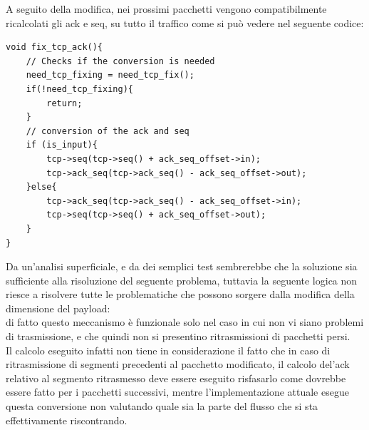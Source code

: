 A seguito della modifica, nei prossimi pacchetti vengono compatibilmente ricalcolati gli ack e seq, su tutto il traffico come si può vedere nel seguente codice:

\begin{listing}[H]
    \begin{verbatim}
void fix_tcp_ack(){
    // Checks if the conversion is needed
    need_tcp_fixing = need_tcp_fix();
    if(!need_tcp_fixing){
        return;
    }
    // conversion of the ack and seq
    if (is_input){
        tcp->seq(tcp->seq() + ack_seq_offset->in);
        tcp->ack_seq(tcp->ack_seq() - ack_seq_offset->out);
    }else{
        tcp->ack_seq(tcp->ack_seq() - ack_seq_offset->in);
        tcp->seq(tcp->seq() + ack_seq_offset->out);
    }
}
\end{verbatim}
\end{listing}

Da un'analisi superficiale, e da dei semplici test sembrerebbe che la soluzione sia sufficiente alla risoluzione del seguente problema, tuttavia la seguente logica
non riesce a risolvere tutte le problematiche che possono sorgere dalla modifica della dimensione del payload:\\
di fatto questo meccanismo è funzionale solo nel caso in cui non vi siano problemi di trasmissione, e che quindi non si presentino ritrasmissioni di pacchetti persi.\\

Il calcolo eseguito infatti non tiene in considerazione il fatto che in caso di ritrasmissione di segmenti precedenti al pacchetto modificato, il calcolo
del'ack relativo al segmento ritrasmesso deve essere eseguito risfasarlo come dovrebbe essere fatto per i pacchetti successivi, mentre l'implementazione
attuale esegue questa conversione non valutando quale sia la parte del flusso che si sta effettivamente riscontrando.\\

